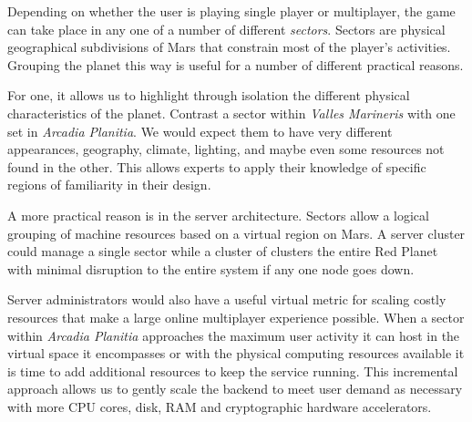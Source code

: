 

Depending on whether the user is playing single player or multiplayer, the game can take place in any one of a number of different {\it sectors}. Sectors are physical geographical subdivisions of Mars that constrain most of the player's activities. Grouping the planet this way is useful for a number of different practical reasons.

For one, it allows us to highlight through isolation the different physical characteristics of the planet. Contrast a sector within {\it Valles Marineris} with one set in {\it Arcadia Planitia}. We would expect them to have very different appearances, geography, climate, lighting, and maybe even some resources not found in the other. This allows experts to apply their knowledge of specific regions of familiarity in their design.

A more practical reason is in the server architecture. Sectors allow a logical grouping of machine resources based on a virtual region on Mars. A server cluster could manage a single sector while a cluster of clusters the entire Red Planet with minimal disruption to the entire system if any one node goes down.

Server administrators would also have a useful virtual metric for scaling costly resources that make a large online multiplayer experience possible. When a sector within {\it Arcadia Planitia} approaches the maximum user activity it can host in the virtual space it encompasses or with the physical computing resources available it is time to add additional resources to keep the service running. This incremental approach allows us to gently scale the backend to meet user demand as necessary with more CPU cores, disk, RAM and cryptographic hardware accelerators.


